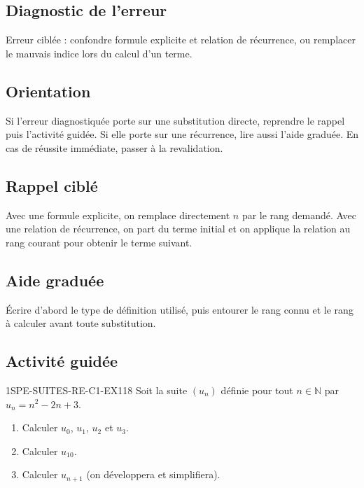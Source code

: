 

\subsection*{Diagnostic de l'erreur}
Erreur ciblée : confondre formule explicite et relation de récurrence, ou
remplacer le mauvais indice lors du calcul d'un terme.

\subsection*{Orientation}
Si l'erreur diagnostiquée porte sur une substitution directe, reprendre le
rappel puis l'activité guidée. Si elle porte sur une récurrence, lire aussi
l'aide graduée. En cas de réussite immédiate, passer à la revalidation.

\subsection*{Rappel ciblé}
Avec une formule explicite, on remplace directement $n$ par le rang demandé.
Avec une relation de récurrence, on part du terme initial et on applique la
relation au rang courant pour obtenir le terme suivant.

\subsection*{Aide graduée}
Écrire d'abord le type de définition utilisé, puis entourer le rang connu et
le rang à calculer avant toute substitution.

\subsection*{Activité guidée}


\begin{exercice}{1SPE-SUITES-RE-C1-EX1}{1}{8}
Soit la suite $(u_n)$ définie pour tout $n \in \mathbb{N}$ par $u_n = n^2 - 2n + 3$.
\begin{enumerate}
  \item Calculer $u_0$, $u_1$, $u_2$ et $u_3$.
  \item Calculer $u_{10}$.
  \item Calculer $u_{n+1}$ (on développera et simplifiera).
\end{enumerate}
\end{exercice}

